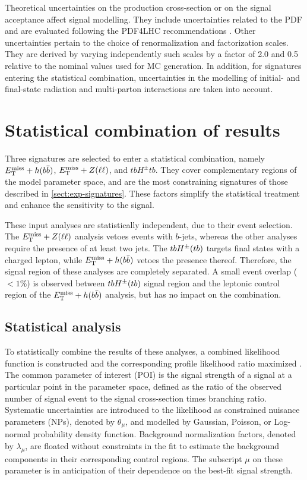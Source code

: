 Theoretical uncertainties on the production cross-section or on the signal acceptance affect signal modelling. They include uncertainties related to the PDF and are evaluated following the PDF4LHC recommendations \cite{Butterworth:2015oua}. Other uncertainties pertain to the choice of renormalization and factorization scales. They are derived by varying independently such scales by a factor of 2.0 and 0.5 relative to the nominal values used for MC generation. In addition, for signatures entering the statistical combination, uncertainties in the modelling of initial- and final-state radiation and multi-parton interactions are taken into account. 

\section{Statistical combination of results}
\label{sect:stat}
Three \thdma signatures are selected to enter a statistical combination, namely $E_{\mathrm{T}}^{\mathrm{miss}}+h(b\bar{b})$, $E_{\mathrm{T}}^{\mathrm{miss}}+Z(\ell\ell)$, and $tbH^{\pm}tb$. They cover complementary regions of the model parameter space, and are the most constraining signatures of those described in \ref{sect:exp-signatures}. These factors simplify the statistical treatment and enhance the sensitivity to the \thdma signal.

These input analyses are statistically independent, due to their event selection. The $E_{\mathrm{T}}^{\mathrm{miss}}+Z(\ell\ell)$ analysis vetoes events with $b$-jets, whereas the other analyses require the presence of at least two jets. The $tbH^{\pm}(tb)$ targets final states with a charged lepton, while $E_{\mathrm{T}}^{\mathrm{miss}}+h(b\bar{b})$ vetoes the presence thereof. Therefore, the signal region of these analyses are completely separated. A small event overlap ($<1\%$) is observed between $tbH^{\pm}(tb)$ signal region and the leptonic control region of the $E_{\mathrm{T}}^{\mathrm{miss}}+h(b\bar{b})$ analysis, but has no impact on the combination.

\subsection{Statistical analysis}

To statistically combine the results of these analyses, a combined likelihood function is constructed and the corresponding profile likelihood ratio maximized \cite{Cowan:2010js}. The common parameter of interest (POI) is the signal strength of a \thdma signal at a particular point in the parameter space, defined as the ratio of the observed number of signal event to the signal cross-section times branching ratio. Systematic uncertainties are introduced to the likelihood as constrained nuisance parameters (NPs), denoted by $\theta_{\mu}$, and modelled by Gaussian, Poisson, or Log-normal probability density function. Background normalization factors, denoted by $\lambda_{\mu}$, are floated without constraints in the fit to estimate the background components in their corresponding control regions. The subscript $\mu$ on these parameter is in anticipation of their dependence on the best-fit signal strength.


